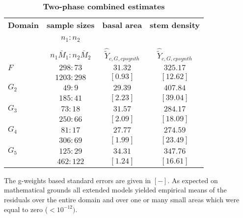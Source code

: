 \documentclass[a4paper,12pt,leqno, titlepage]{article}
\begin{document}
\begin{table}[h]
\begin{center}
\caption{ \label{result5}\textbf{Two-phase combined estimates}}
\end{center}
\begin{center}
 \begin{tabular}{|l|c|c|c|}
   \textbf{Domain} & \textbf{sample sizes} & \textbf{basal area}  & \textbf{stem density}\\[1.0ex]
 $ $   & $n_1:n_2$    &  & \ \\[1.0ex]
 $ $   & $n_1\bar{M}_1:n_2\bar{M}_2$  & $ \hat{\tilde{Y}}_{c,G,cpsynth}$ &$\hat{\tilde{Y}}_{c,G,cpsynth}$ \\ \hline
 $F$            & $ 298:73$   &  $31.32 $    &  $325.17$       \\ [1.0ex]
                & $1203:298$  &  $[0.93]$    &  $[12.62]$       \\ \hline \hline
 $G_2$          &  $49:9$     &  $29.39 $    &  $407.84$        \\ [1.0ex]
                &  $185:41$   &  $[2.23]$    &  $[39.04]$       \\ \hline \hline
 $G_3$          &  $73:18$     &  $31.57 $    &  $284.17$         \\ [1.0ex]
                & $250:66$    &  $[2.09]$    &  $[18.09]$       \\ \hline \hline
 $G_4$          &  $81:17$     &  $27.77 $    &  $274.59$        \\ [1.0ex]
                & $306:69$    &  $[1.99]$   &  $[23.49]$        \\ \hline \hline
 $G_5$          &  $125:29$    &  $34.31$    &  $347.76$          \\ [1.0ex]
                & $462:122$   &  $[1.24]$   &  $[16.61]$         \\ \hline \hline
\end{tabular}
\end{center}
The g-weights based standard errors are given in $[-]$. As expected on mathematical grounds all extended models yielded empirical means of the residuals over the entire domain and over one or many small areas which were equal to zero ($<10^{-12})$.
\end{table}
\end{document}
